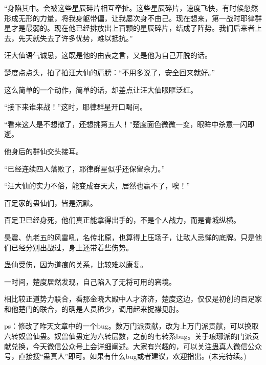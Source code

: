 \begin{this_body}
“身陷其中。会被这些星辰碎片相互牵扯。这些星辰碎片，速度飞快，有时候忽然形成无形的力量，将我身躯带偏，让我屡次身不由己。现在想来，第一战时耶律群星才是最弱的。现在他已经排放出上百颗的星辰碎片，结成了阵势。我们后来者上去，先天就失去了许多优势，难以抵抗。”

汪大仙语气诚恳，这既是他的由衷之言，又是他为自己开脱的话。

楚度点点头，拍了拍汪大仙的肩膀：“不用多说了，安全回来就好。”

这么简单的一个动作，简单的话，却差点让汪大仙眼眶泛红。

“接下来谁来战！”这时，耶律群星开口喝问。

“看来这人是不想撤了，还想挑第五人！”楚度面色微微一变，眼眸中杀意一闪即逝。

他身后的群仙交头接耳。

“已经连续四人落败了，耶律群星似乎还保留余力。”

“汪大仙的实力不俗，能变成吞天犬，居然也赢不了，唉！”

百足家的蛊仙们，皆是沉默。

百足卫已经身死，他们真正能拿得出手的，不是个人战力，而是青城纵横。

昊震、仇老五的风雷吼，名传北原，也算得上压场子，让敌人忌惮的底牌。只是他们已经分别出战过，身上还带着些伤势。

蛊仙受伤，因为道痕的关系，比较难以康复。

一时间，楚度居然发现，自己陷入了无将可用的窘境。

相比较正道势力联合，看那金晓大殿中人才济济，楚度这边，仅仅是初创的百足家和他楚门的联合，的确是人员稀少，调用起来捉襟见肘。

ps：修改了昨天文章中的一个bug。数万门派贡献，改为上万门派贡献，可以换取六转奴兽仙蛊。奴兽仙蛊定为六转层数，之前的七转系bug。关于琅琊派的门派贡献兑换，今天微信公众号上会详细阐述。大家有兴趣的，可以关注蛊真人微信公众号，直接搜“蛊真人”即可。如果有什么bug或者建议，欢迎指出。(未完待续。)

\end{this_body}

